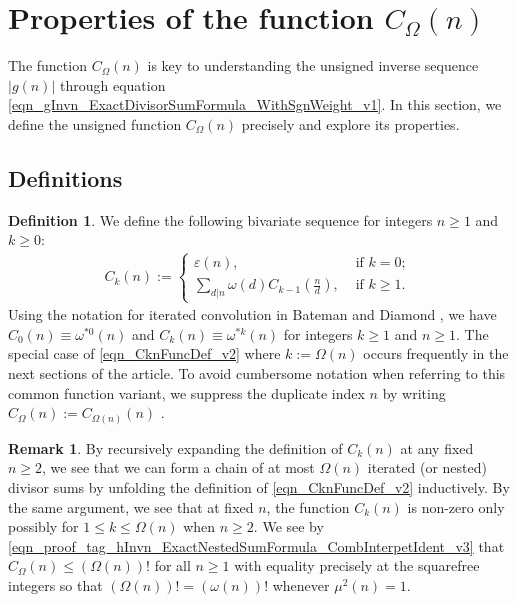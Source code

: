 \documentclass[11pt,reqno,a4letter]{article}
\numberwithin{equation}{section}
\numberwithin{figure}{section}
\numberwithin{table}{section}
\newcommand{\seqnum}[1]{\href{http://oeis.org/#1}{\color{ProcessBlue}{\underline{#1}}}}
\theoremstyle{plain}
\numberwithin{theorem}{section}
\theoremstyle{definition}
\newtheorem{remark}[theorem]{Remark}
\newtheorem{definition}[theorem]{Definition}
\begin{document}
\section{Properties of the function $C_{\Omega}(n)$} 
\label{Section_NewFormulasForgInvn_v1} 

The function $C_{\Omega}(n)$ is key to understanding the 
unsigned inverse sequence $|g(n)|$ through equation 
\eqref{eqn_gInvn_ExactDivisorSumFormula_WithSgnWeight_v1}. 
In this section, we define the unsigned function 
$C_{\Omega}(n)$ precisely and explore its properties. 

\subsection{Definitions}

\begin{definition}
We define the following bivariate sequence for integers $n \geq 1$ and $k \geq 0$: 
\begin{align} 
\label{eqn_CknFuncDef_v2} 
C_k(n) := \begin{cases} 
     \varepsilon(n), & \text{ if $k = 0$; } \\ 
     \sum\limits_{d|n} \omega(d) C_{k-1}\left(\frac{n}{d}\right), & \text{ if $k \geq 1$. } 
     \end{cases} 
\end{align} 
Using the notation for iterated convolution in 
Bateman and Diamond \cite[Def.~ 2.3; \S 2]{ANT-BATEMAN-DIAMOND}, we have 
$C_0(n) \equiv \omega^{\ast 0}(n)$ and $C_k(n) \equiv \omega^{\ast k}(n)$ for 
integers $k \geq 1$ and $n \geq 1$. 
The special case of \eqref{eqn_CknFuncDef_v2} where 
$k := \Omega(n)$ occurs frequently in the next sections of the 
article. To avoid cumbersome notation when referring to this common function variant, we suppress the 
duplicate index $n$ by writing $C_{\Omega}(n) := C_{\Omega(n)}(n)$ \cite[\seqnum{A008480}]{OEIS}. 
\end{definition}

\begin{remark}
By recursively expanding the definition of $C_k(n)$ 
at any fixed $n \geq 2$, we see that 
we can form a chain of at most $\Omega(n)$ iterated (or nested) divisor sums by 
unfolding the definition of \eqref{eqn_CknFuncDef_v2} inductively. 
By the same argument, we see that at fixed $n$, the function 
$C_k(n)$ is non-zero only possibly for 
$1 \leq k \leq \Omega(n)$ when $n \geq 2$. 
We see by 
\eqref{eqn_proof_tag_hInvn_ExactNestedSumFormula_CombInterpetIdent_v3} 
that $C_{\Omega}(n) \leq (\Omega(n))!$ for all $n \geq 1$ with 
equality precisely at the squarefree integers so that 
$(\Omega(n))! = (\omega(n))!$ whenever $\mu^2(n) = 1$. 
\end{remark}
\end{document}
